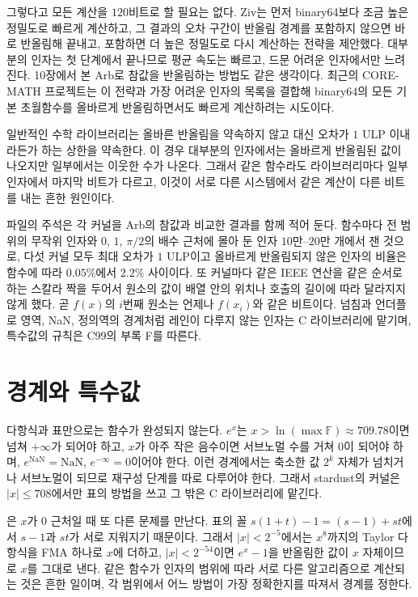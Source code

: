 그렇다고 모든 계산을 $120$비트로 할 필요는 없다. Ziv는 먼저 binary64보다 조금 높은 정밀도로 빠르게 계산하고, 그 결과의 오차 구간이 반올림 경계를 포함하지 않으면 바로 반올림해 끝내고, 포함하면 더 높은 정밀도로 다시 계산하는 전략을 제안했다\cite{ziv1991}. 대부분의 인자는 첫 단계에서 끝나므로 평균 속도는 빠르고, 드문 어려운 인자에서만 느려진다. 10장에서 본 Arb로 참값을 반올림하는 방법도 같은 생각이다. 최근의 CORE-MATH 프로젝트는 이 전략과 가장 어려운 인자의 목록을 결합해 binary64의 모든 기본 초월함수를 올바르게 반올림하면서도 빠르게 계산하려는 시도이다\cite{coremath2022}.

일반적인 수학 라이브러리는 올바른 반올림을 약속하지 않고 대신 오차가 $1$ ULP 이내라든가 하는 상한을 약속한다. 이 경우 대부분의 인자에서는 올바르게 반올림된 값이 나오지만 일부에서는 이웃한 수가 나온다. 그래서 같은 함수라도 라이브러리마다 일부 인자에서 마지막 비트가 다르고, 이것이 서로 다른 시스템에서 같은 계산이 다른 비트를 내는 흔한 원인이다.

\begin{instardust}
파일의 주석은 각 커널을 Arb의 참값과 비교한 결과를 함께 적어 둔다. 함수마다 전 범위의 무작위 인자와 $0$, $1$, $\pi/2$의 배수 근처에 몰아 둔 인자 $10$만--$20$만 개에서 잰 것으로, 다섯 커널 모두 최대 오차가 $1$ ULP이고 올바르게 반올림되지 않은 인자의 비율은 함수에 따라 $0.05\%$에서 $2.2\%$ 사이이다. 또 커널마다 같은 IEEE 연산을 같은 순서로 하는 스칼라 짝을 두어서 원소의 값이 배열 안의 위치나 호출의 길이에 따라 달라지지 않게 했다. 곧 $f(x)$의 $i$번째 원소는 언제나 $f(x_i)$와 같은 비트이다. 넘침과 언더플로 영역, NaN, 정의역의 경계처럼 레인이 다루지 않는 인자는 C 라이브러리에 맡기며, 특수값의 규칙은 C99의 부록 F를 따른다.
\end{instardust}

\section{경계와 특수값}
\label{sec:edge-cases}

다항식과 표만으로는 함수가 완성되지 않는다. $e^x$는 $x>\ln(\max\mathbb F)\approx709.78$이면 넘쳐 $+\infty$가 되어야 하고, $x$가 아주 작은 음수이면 서브노멀 수를 거쳐 $0$이 되어야 하며, $e^{\mathrm{NaN}}=\mathrm{NaN}$, $e^{-\infty}=0$이어야 한다. 이런 경계에서는 축소한 값 $2^k$ 자체가 넘치거나 서브노멀이 되므로 재구성 단계를 따로 다루어야 한다. 그래서 stardust의  커널은 $|x|\le708$에서만 표의 방법을 쓰고 그 밖은 C 라이브러리에 맡긴다.

은 $x$가 $0$ 근처일 때 또 다른 문제를 만난다. 표의 꼴 $s(1+t)-1=(s-1)+st$에서 $s-1$과 $st$가 서로 지워지기 때문이다. 그래서 $|x|<2^{-5}$에서는 $x^8$까지의 Taylor 다항식을 FMA 하나로 $x$에 더하고, $|x|<2^{-54}$이면 $e^x-1$을 반올림한 값이 $x$ 자체이므로 $x$를 그대로 낸다. 같은 함수가 인자의 범위에 따라 서로 다른 알고리즘으로 계산되는 것은 흔한 일이며, 각 범위에서 어느 방법이 가장 정확한지를 따져서 경계를 정한다.

